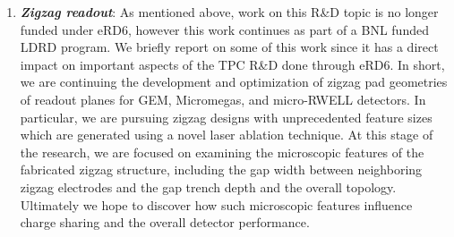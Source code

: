 \begin{enumerate}
\item	\textbf{\emph{Zigzag readout}}: As mentioned above, work on this R\&D topic is no longer funded under eRD6, however this work continues as part of a BNL funded LDRD program. We briefly report on some of this work since it has a direct impact on important aspects of the TPC R\&D done through eRD6. In short, we are continuing the development and optimization of zigzag pad geometries of readout planes for GEM, Micromegas, and micro-RWELL detectors. In particular, we are pursuing zigzag designs with unprecedented feature sizes which are generated using a novel laser ablation technique. At this stage of the research, we are focused on examining the microscopic features of the fabricated zigzag structure, including the gap width between neighboring zigzag electrodes and the gap trench depth and the overall topology. Ultimately we hope to discover how such microscopic features influence charge sharing and the overall detector performance. 



\end{enumerate}